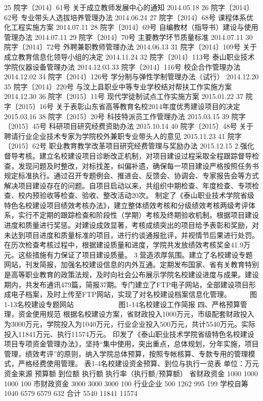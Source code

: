 25
院字〔2014〕61号
关于成立教师发展中心的通知
2014.05.18
26
院字〔2014〕62号
专业带头人选拔培养管理办法
2014.06.24
27
院字〔2014〕68号
课程体系优化工程实施方案
2014.07.11
28
院字〔2014〕69号
自编教材（指导书）建设与使用管理办法
2014.07.11
29
院字〔2014〕70号
主要教学环节质量标准
2014.07.11
30
院字〔2014〕72号
外聘兼职教师管理办法
2014.06.13
31
院字〔2014〕109号
关于成立教育信息化领导小组的决定
2014.11.24
32
院字〔2014〕113号
泰山职业技术学院仪器设备管理办法
2014.12.03
33
院字〔2014〕116号
校企合作管理办法
2014.12.02
34
院字〔2014〕126号
学分制与弹性学制管理办法（试行）
2014.12.20
35
院字〔2014〕220号
与汶上县职业中等专业学校结对帮扶工作实施方案
2014.12.30
36
院字〔2015〕11号
现代学徒制试点工作实施方案
2015.01.22
37
院字〔2015〕16号
关于表彰山东省高等教育名校2014年度优秀建设项目的决定
2015.03.16
38
院字〔2015〕20号
科技特派员工作管理办法
2015.03.15
39
院字〔2015〕45号
科研项目研究经费资助办法
2015.10.14
40
院字〔2015〕48号
关于聘请行业企业技术专家为学院校外兼职专业带头人的意见
2015.11.23
41
院字〔2015〕62号
职业教育教学改革项目研究经费管理与奖励办法
2015.12.15
2.强化督导考核。建立名校建设项目诊断改正机制，对项目建设过程采取全程跟踪督导检查，发现问题及时整改，对标找差，纠偏补遗，确保每一项目建设严格按照任务书规定标准执行。通过召开专题例会、推进会、反馈会、协调会、专家报告会等方式解决项目建设存在的问题。自项目启动以来，共组织中期检查、年度检查、专项检查、校内预验收等检查、验收、整改活动20次。
制定了《泰山职业技术学院省级特色名校建设项目绩效考核办法》，建立整体绩效考核和分级绩效考核两级考评体系，实行不定期的跟踪检查和阶段性（学期）考核及终期验收机制。根据项目建设进度和质量进行奖惩。对建设成效显著，考核成绩突出的项目给予表彰和奖励，对未达到项目进度和质量标准的项目，进行约谈通报批评，并视情节后果进行处罚。在历次检查考核过程中，根据建设质量和进度，学院共发放绩效考核奖金41.9万元。这些措施有力保证了项目建设质量。
3.营造浓厚氛围。建立了名校建设专题网站，刊发简报，加强名校建设信息的内外互通。定期发布国家、省有关教育特别是高等职业教育的政策法规，及时向社会公布展示学院名校建设进度与成果。建设期内，共发布通讯479篇，简报37期。专门建立了FTP电子网站，全部建设项目形成电子档案，及时上传至FTP网站，实现了对名校建设档案信息化管理。
　　 
              图1-13名校建设专题网站　　　　　  　图1-14名校建设工作简报
四、严格预算管理，资金使用规范
根据名校建设方案，省财政投入1000万元，市级配套财政投入为3000万元，学院投入为1040万元，行业企业投入500万元，共计5540万元。实际投入11841万元、执行11574万元。
印发了《泰山职业技术学院省级特色名校建设项目专项资金管理办法》，坚持“集中使用，突出重点，总体规划，分年实施，项目管理，绩效考评”的原则，纳入学院总体预算，按照专帐核算、专款专用的管理模式，严格经费使用管理。
表1-4名校建设资金预算、到位与执行一览表
单位：万元
资金来源
预算额
到位额
执行额
执行率（执行额/预算额）
省财政资金
1000
1000
1000
100%
市财政资金
3000
3000
3000
100%
行业企业
500
1262
995
199%
学校自筹
1040
6579
6579
632%
合计
5540
11841
11574

